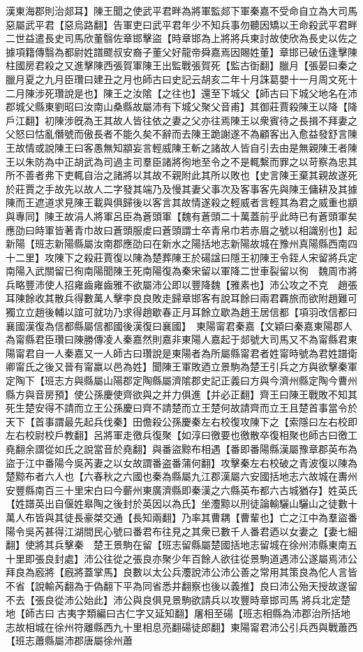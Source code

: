 漢東海郡則治郯耳】陳王聞之使武平君畔為將軍監郯下軍秦嘉不受命自立為大司馬惡屬武平君【惡烏路翻】告軍吏曰武平君年少不知兵事勿聽因矯以王命殺武平君畔二世益遣長史司馬欣董翳佐章邯擊盜【時章邯為上將將兵東討故使欣為長史以佐之據項籍傳翳為都尉姓譜飂叔安裔子董父好龍帝舜嘉焉因賜姓董】章邯已破伍逢擊陳柱國房君殺之又進擊陳西張賀軍陳王出監戰張賀死【監古衘翻】臘月【張晏曰秦之臘月夏之九月臣瓚曰建丑之月也師古曰史記云胡亥二年十月誅葛嬰十一月周文死十二月陳涉死瓚說是也】陳王之汝隂【之往也】還至下城父【師古曰下城父地名在沛郡城父縣東劉昭曰汝南山桑縣故屬沛有下城父聚父音甫】其御莊賈殺陳王以降【降戶江翻】初陳涉旣為王其故人皆往依之妻之父亦往焉陳王以衆賓待之長揖不拜妻之父怒曰怙亂僭號而傲長者不能久矣不辭而去陳王跪謝遂不為顧客出入愈益發舒言陳王故情或說陳王曰客愚無知顓妄言輕威陳王斬之諸故人皆自引去由是無親陳王者陳王以朱防為中正胡武為司過主司羣臣諸將徇地至令之不是輒繫而罪之以苛察為忠其所不善者弗下吏輒自治之諸將以其故不親附此其所以敗也【史言陳王棄其親故遂死於莊賈之手故先以故人二字發其端乃及慢其妻父事次及客事客先與陳王傭耕及其據陳而王遮道求見陳王載與俱歸後以客言其故情遂殺之輕威者言輕其為君之威重也顓與專同】陳王故涓人將軍呂臣為蒼頭軍【魏有蒼頭二十萬蓋前乎此時已有蒼頭軍矣應劭曰時軍皆著青巾故曰蒼頭服䖍曰蒼頭謂士卒青帛巾若赤眉之號以相識别也】起新陽【班志新陽縣屬汝南郡應劭曰在新水之陽括地志新陽故城在豫州真陽縣西南四十二里】攻陳下之殺莊賈復以陳為楚葬陳王於碭諡曰隱王初陳王令銍人宋留將兵定南陽入武關留已徇南陽聞陳王死南陽復為秦宋留以軍降二世車裂留以徇　魏周市將兵略豐沛使人招雍齒雍齒雅不欲屬沛公即以豐降魏【雅素也】沛公攻之不克　趙張耳陳餘收其散兵得數萬人擊李良良敗走歸章邯客有說耳餘曰兩君覉旅而欲附趙難可獨立立趙後輔以誼可就功乃求得趙歇春正月耳餘立歇為趙王居信都【項羽改信都曰襄國漢復為信都縣屬信都國後漢復曰襄國】　東陽甯君秦嘉【文穎曰秦嘉東陽郡人為甯縣君臣瓚曰陳勝傳凌人秦嘉然則嘉非東陽人嘉起于郯號大司馬又不為甯縣君東陽甯君自一人秦嘉又一人師古曰瓚說是東陽者為所屬縣甯君者姓甯時號為君姓譜衛卿甯氏之後又晉有甯嬴以邑為姓】聞陳王軍敗迺立景駒為楚王引兵之方與欲擊秦軍定陶下【班志方與縣屬山陽郡定陶縣屬濟隂郡史記正義曰方與今濟州縣定陶今曹州縣方與音房預】使公孫慶使齊欲與之并力俱進【并必正翻】齊王曰陳王戰敗不知其死生楚安得不請而立王公孫慶曰齊不請楚而立王楚何故請齊而立王且楚首事當令於天下【首事謂最先起兵伐秦】田儋殺公孫慶秦左右校復攻陳下之【索隱曰左右校即左右校尉校戶教翻】呂將軍走徼兵復聚【如淳曰徼要也徼散卒復相聚也師古曰徼工堯翻余謂從如氏之說當音於堯翻】與番盜黥布相遇【番即番陽縣漢屬豫章郡英布為盜于江中番陽今吳芮妻之以女故謂番盗番蒲何翻】攻擊秦左右校破之青波復以陳為楚黥布者六人也【六春秋之六國也秦為縣屬九江郡漢屬六安國括地志六故城在夀州安豐縣南百三十里宋白曰今蘄州東廣濟縣即秦漢之六縣英布都六古城猶存】姓英氏【姓譜英出自偃姓皋陶之後封於英因以為氏】坐灋黥以刑徒論輸驪山驪山之徒數十萬人布皆與其徒長豪桀交通【長知兩翻】乃率其曹耦【曹輩也】亡之江中為羣盜番陽令吳芮甚得江湖間民心號曰番君布往見之其衆已數千人番君迺以女妻之【妻七細翻】使將其兵擊秦　楚王景駒在留【班志留縣屬楚國括地志留城在徐州沛縣東南五十里即張良封處】沛公往從之張良亦聚少年百餘人欲往從景駒道遇沛公遂屬焉沛公拜良為廏將【廐將蓋掌馬】良數以太公兵灋說沛公沛公善之常用其策良為佗人言皆不省【說輸芮翻為于偽翻下平為同省悉井翻察也後以義推】良曰沛公殆天授故遂留不去【張良從沛公始此】沛公與良俱見景駒欲請兵以攻豐時章邯司馬將兵北定楚地【師古曰古夷字類編曰古仁字又延知翻】屠相至碭【班志相縣為沛郡治所括地志故相城在徐州符離縣西九十里相息亮翻碭徒郎翻】東陽甯君沛公引兵西與戰蕭西【班志蕭縣屬沛郡唐屬徐州蕭
